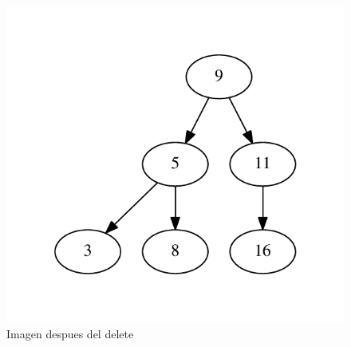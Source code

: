 \documentclass[a4paper,12pt]{article}
\begin{document}
\begin{figure}[h]
 \centering
 \includegraphics[scale = 0.5]{2.pdf}
 \caption{Imagen despues del delete}
\end{figure}
\end{document}
